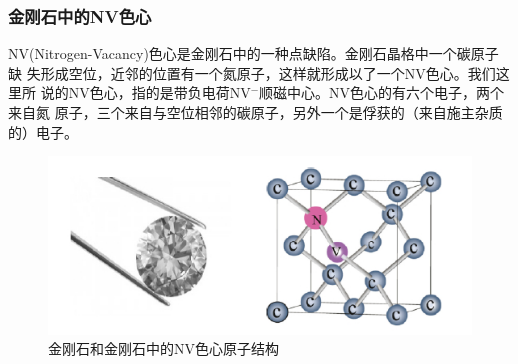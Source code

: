 \documentclass[a4paper]{article}
\begin{document}
\subsubsection{金刚石中的NV色心}

NV(Nitrogen-Vacancy)色心是金刚石中的一种点缺陷。金刚石晶格中一个碳原子缺
失形成空位，近邻的位置有一个氮原子，这样就形成以了一个NV色心。我们这里所
说的NV色心，指的是带负电荷NV$ ^- $顺磁中心。NV色心的有六个电子，两个来自氮
原子，三个来自与空位相邻的碳原子，另外一个是俘获的（来自施主杂质的）电子。
\begin{figure}[H]
	\centering
	\includegraphics[width=0.8\linewidth]{fig/NV.jpg}
	\caption{金刚石和金刚石中的NV色心原子结构}
	\label{fig:NV}
\end{figure}
\end{document}
